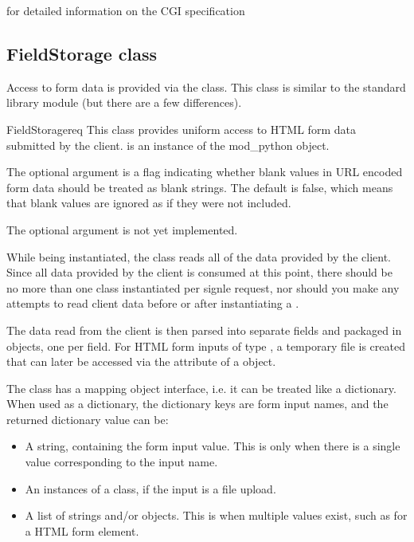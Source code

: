 \begin{seealso}
	{for detailed information on the CGI specification}
\end{seealso}

\subsection{FieldStorage class\label{pyapi-util-fstor}}

Access to form data is provided via the 
class. This class is similar to the standard library module 
 (but there are a few differences).

\begin{classdesc}{FieldStorage}{req}
This class provides uniform access to HTML form data submitted by the client.
 is an instance of the mod_python  object.

The optional argument  is a flag indicating whether
blank values in URL encoded form data should be treated as blank strings. The
default is false, which means that blank values are ignored as if they were
not included.

The optional argument  is not yet implemented.
\end{classdesc}

While being instantiated, the  class reads all of
the data provided by the client. Since all data provided by the client
is consumed at this point, there should be no more than one
 class instantiated per signle request, nor should
you make any attempts to read client data before or after
instantiating a .

The data read from the client is then parsed into separate fields
and packaged in  objects, one per field. For HTML form
inputs of type , a temporary file is created that can later be 
accessed via the  attribute of a  object.

The  class has a mapping object interface, i.e. it
can be treated like a dictionary. When used as a dictionary, the dictionary 
keys are form input names, and the returned dictionary value can be:

\begin{itemize}
\item
A string, containing the form input value. This is only when there is a single
value corresponding to the input name.
\item
An instances of a  class, if the input is a file upload.
\item
A list of strings and/or  objects. This is when multiple values
exist, such as for a  HTML form element.
\end{itemize}

